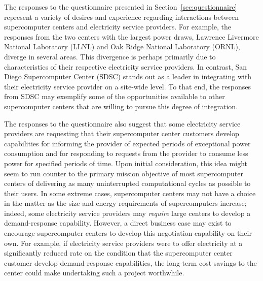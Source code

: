 The responses to the questionnaire presented in
Section~\ref{sec:questionnaire} represent a variety of desires and
experience regarding interactions between supercomputer centers and
electricity service providers.  For example, the responses from the two centers
with the largest power draws, Lawrence Livermore National Laboratory
(LLNL) and Oak Ridge National Laboratory (ORNL), diverge in several
areas.  This divergence is perhaps primarily due to characteristics of
their respective electricity service providers.  In contrast, San Diego
Supercomputer Center (SDSC) stands out as a leader in integrating
with their electricity service provider on a site-wide level.  To that end, the
responses from SDSC may exemplify some of the opportunities available
to other supercomputer centers that are willing to pursue this degree
of integration.

The responses to the questionnaire also suggest that some electricity service
providers are requesting that their supercomputer center customers
develop capabilities for informing the provider of expected periods of
exceptional power consumption and for responding to requests from the
provider to consume less power for specified periods of time.  Upon
initial consideration, this idea might seem to run counter to the
primary mission objective of most supercomputer centers of delivering
as many uninterrupted computational cycles as possible to their users.
In some extreme cases, supercomputer centers may not have a choice
in the matter as the size and energy requirements of supercomputers
increase; indeed, some electricity service providers may \textit{require} large
centers to develop a demand-response capability.  However, a direct
business case may exist to encourage supercomputer centers to develop
this negotiation capability on their own.  For example, if electricity service
providers were to offer electricity at a significantly reduced rate
on the condition that the supercomputer center customer develop
demand-response capabilities, the long-term cost savings to the
center could make undertaking such a project worthwhile.

